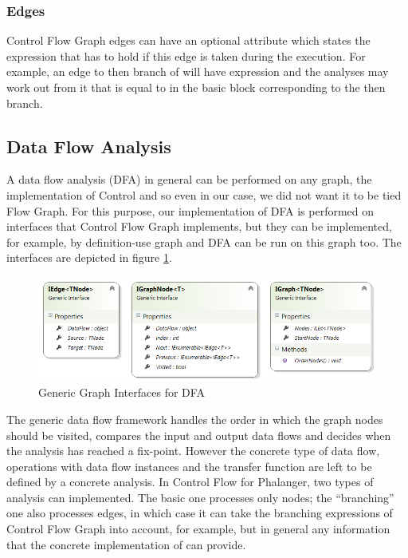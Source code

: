         \subsubsection*{Edges}
        Control Flow Graph edges can have an optional attribute which 
        states the expression that has to hold if this edge is taken 
        during the execution. For example, an edge to then branch of 
         will have expression  and the 
        analyses may work out from it that  is equal to 
         in the basic block corresponding to the then branch.
        
    \subsection{Data Flow Analysis}
        A data flow analysis (DFA) in general can be performed on any graph, 
        the implementation of Control 
        and so even in our case, we did not want it to be tied 
        Flow Graph. For this purpose, our implementation of DFA is 
        performed on interfaces that Control Flow Graph implements, 
        but they can be implemented, for example, by definition-use 
        graph\cite{aho1985compilers} and DFA can be run on this graph too.
        The interfaces are depicted in figure \ref{graphifaces}.
        
\begin{figure}[h]  
  \centering
    \includegraphics*[width=\textwidth,height=\textheight,keepaspectratio]{img/graph-ifaces.png}  
    \caption{Generic Graph Interfaces for DFA\label{graphifaces}}
\end{figure}    

        The generic data flow framework handles the order in which the 
        graph nodes should be visited, compares the input and output 
        data flows and decides when the analysis has reached a fix-point. 
        However the concrete type of data flow, operations with data 
        flow instances and the transfer function are left to be defined 
        by a concrete analysis. In Control Flow for 
        Phalanger, two types of analysis can implemented. The basic one 
        processes only nodes; the ``branching'' one also processes edges, 
        in which case it can take the branching expressions of Control 
        Flow Graph into account, for example, but in general any information 
        that the concrete implementation of  can provide.
        
